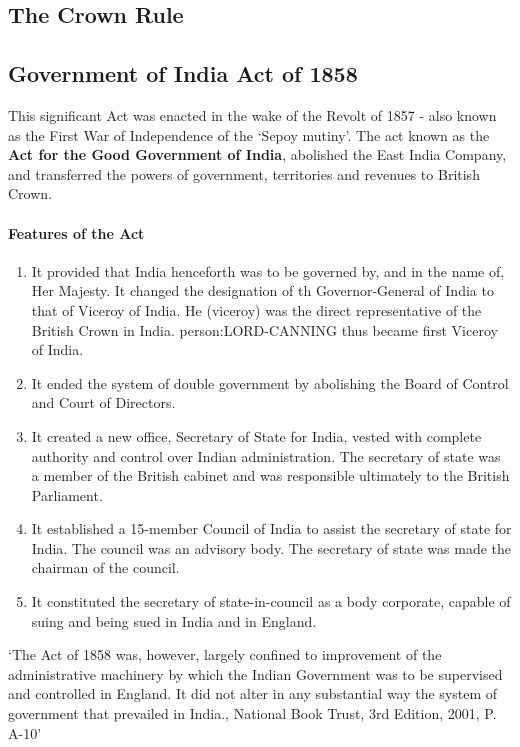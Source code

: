 \begin{multicols}{2}
\section{The Crown Rule}

\subsection{Government of India Act of 1858}
This significant Act was enacted in the wake of the Revolt of 1857 - also known as the First War of Independence of the `Sepoy mutiny'. The act known as the \textbf{Act for the Good Government of India}, abolished the East India Company, and transferred the powers of government, territories and revenues to British Crown.

\paragraph{Features of the Act}
\begin{enumerate}
  \item It provided that India henceforth was to be governed by, and in the name of, Her Majesty. It changed the designation of th Governor-General of India to that of Viceroy of India. He (viceroy) was the direct representative of the British Crown in India. \gls{person:LORD-CANNING} thus became first Viceroy of India.
  \item It ended the system of double government by abolishing the Board of Control and Court of Directors.
  \item It created a new office, Secretary of State for India, vested with complete authority and control over Indian administration. The secretary of state was a member of the British cabinet and was responsible ultimately to the British Parliament.
  \item It established a 15-member Council of India to assist the secretary of state for India. The council was an advisory body. The secretary of state was made the chairman of the council.
  \item It constituted the secretary of state-in-council as a body corporate, capable of suing and being sued in India and in England.
\end{enumerate}

`The Act of 1858 was, however, largely confined to improvement of the administrative machinery by which the Indian Government was to be supervised and controlled in England. It did not alter in any substantial way the system of government that prevailed in India., National Book Trust, 3rd Edition, 2001, P. A-10'



\end{multicols}

